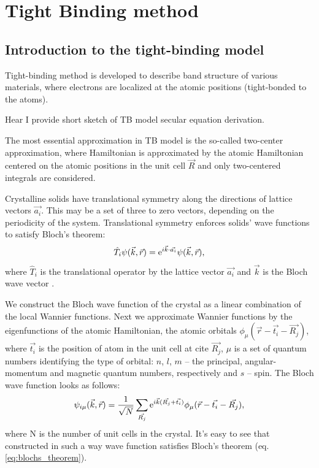\chapter{Tight Binding method}
\label{ch:theory}
\section{Introduction to the tight-binding model} \label{sec:TB_theory}
Tight-binding method is developed to describe band structure of various materials, where electrons are localized at the atomic positions (tight-bonded to the atoms). 

Hear I provide short sketch of TB model secular equation derivation.

The most essential approximation in TB model is the so-called two-center approximation, where Hamiltonian is approximated by the atomic Hamiltonian centered on the atomic positions in the unit cell $\vec{R}$ and only two-centered integrals are considered.

Crystalline solids have translational symmetry along the directions of lattice vectors $\vec{a_i}$. This may be a set of three to zero vectors, depending on the periodicity of the system. Translational symmetry enforces solids' wave functions to satisfy Bloch's theorem:
\begin{equation} \label{eq:blochs_theorem}
	\hat{T}_i \psi(\vec{k},\vec{r}) = \mathrm{e}^{i \vec{k} \cdot \vec{a_i}} \psi(\vec{k},\vec{r}),
\end{equation}
where $\hat{T}_i$ is the translational operator by the lattice vector $\vec{a_i}$ and $\vec{k}$ is the Bloch wave vector \cite{kittel}.

We construct the Bloch wave function of the crystal as a linear combination of the local Wannier functions. Next we approximate Wannier functions by the eigenfunctions of the atomic Hamiltonian, the atomic orbitals $\phi_{\mu}(\vec{r} - \vec{t_i} - \vec{R_j})$, where $\vec{t_i}$ is the position of atom in the unit cell at cite $\vec{R_j}$, $\mu$ is a set of quantum numbers identifying the type of orbital: $n$, $l$, $m$ -- the principal, angular-momentum and magnetic quantum numbers, respectively and $s$ -- spin. The Bloch wave function looks as follows:
\begin{equation} \label{eq:wave_fun}
	\psi_{i \mu}(\vec{k},\vec{r}) = \frac{1}{\sqrt{N}} \sum_{\vec{R_j}} \mathrm{e}^{i\vec{k}(\vec{R_j} + \vec{t_i})} \phi_{\mu} (\vec{r} - \vec{t_i} - \vec{R_j}),
\end{equation}
where N is the number of unit cells in the crystal. It's easy to see that constructed in such a way wave function satisfies Bloch's theorem (eq. \ref{eq:blochs_theorem}).

